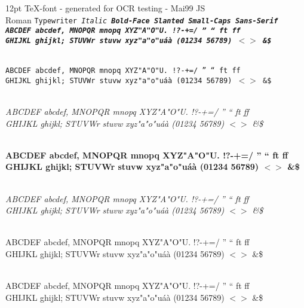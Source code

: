 \topmargin=-25mm         \textheight=140mm
\oddsidemargin=-10mm     \evensidemargin=-10mm \textwidth=160mm
\parindent0mm \pagestyle{empty}

\def\f{
 \\ ABCDEF abcdef, MNOPQR mnopq XYZ"A"O"U. !?-+=/ '' `` ft ff
 \\ GHIJKL ghijkl; STUVWr stuvw xyz"a"o"u\'a\`a \3 (01234 56789) $<>$ \&\$
}
12pt TeX-font - generated for OCR testing - Mai99 JS
\\ \rm Roman \tt Typewriter \it Italic \bf Bold-Face
   \sl Slanted \sc Small-Caps \sf Sans-Serif
\rm \f
\tt \f
\it \f
\bf \f
\sl \f
\sc \f
\sf \f


